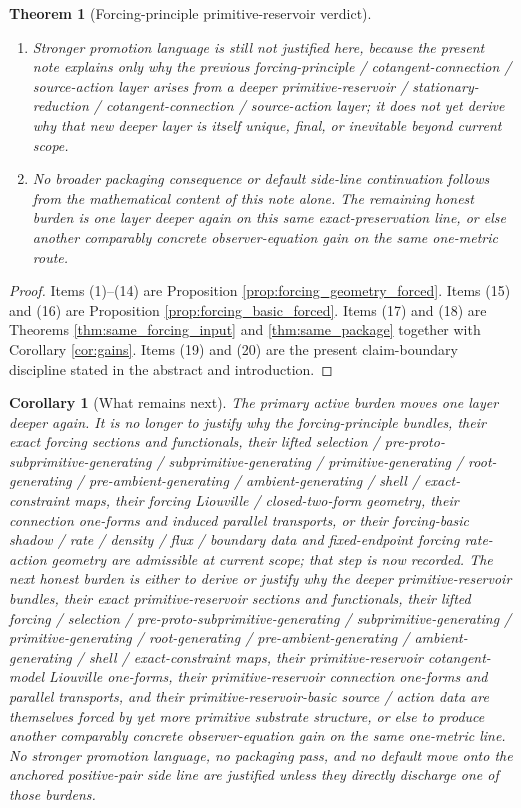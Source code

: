\documentclass[11pt]{article}
\newtheorem{corollary}{Corollary}
\newtheorem{theorem}{Theorem}
\begin{document}
\begin{theorem}[Forcing-principle primitive-reservoir verdict]
\begin{enumerate}
    \item Stronger promotion language is still not justified here, because the present note explains only why the previous forcing-principle / cotangent-connection / source-action layer arises from a deeper primitive-reservoir / stationary-reduction / cotangent-connection / source-action layer; it does not yet derive why that new deeper layer is itself unique, final, or inevitable beyond current scope.
    \item No broader packaging consequence or default side-line continuation follows from the mathematical content of this note alone. The remaining honest burden is one layer deeper again on this same exact-preservation line, or else another comparably concrete observer-equation gain on the same one-metric route.
\end{enumerate}
\end{theorem}

\begin{proof}
Items (1)--(14) are Proposition \ref{prop:forcing_geometry_forced}. Items (15) and (16) are Proposition \ref{prop:forcing_basic_forced}. Items (17) and (18) are Theorems \ref{thm:same_forcing_input} and \ref{thm:same_package} together with Corollary \ref{cor:gains}. Items (19) and (20) are the present claim-boundary discipline stated in the abstract and introduction.
\end{proof}

\begin{corollary}[What remains next]
\label{cor:what_next}
The primary active burden moves one layer deeper again. It is no longer to justify why the forcing-principle bundles, their exact forcing sections and functionals, their lifted selection / pre-proto-subprimitive-generating / subprimitive-generating / primitive-generating / root-generating / pre-ambient-generating / ambient-generating / shell / exact-constraint maps, their forcing Liouville / closed-two-form geometry, their connection one-forms and induced parallel transports, or their forcing-basic shadow / rate / density / flux / boundary data and fixed-endpoint forcing rate-action geometry are admissible at current scope; that step is now recorded. The next honest burden is either to derive or justify why the deeper primitive-reservoir bundles, their exact primitive-reservoir sections and functionals, their lifted forcing / selection / pre-proto-subprimitive-generating / subprimitive-generating / primitive-generating / root-generating / pre-ambient-generating / ambient-generating / shell / exact-constraint maps, their primitive-reservoir cotangent-model Liouville one-forms, their primitive-reservoir connection one-forms and parallel transports, and their primitive-reservoir-basic source / action data are themselves forced by yet more primitive substrate structure, or else to produce another comparably concrete observer-equation gain on the same one-metric line. No stronger promotion language, no packaging pass, and no default move onto the anchored positive-pair side line are justified unless they directly discharge one of those burdens.
\end{corollary}
\end{document}
